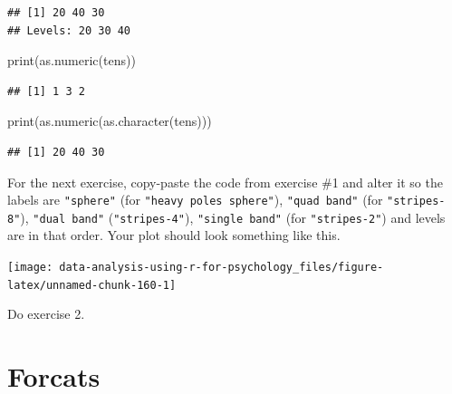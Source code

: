 \documentclass[
]{book}
\newenvironment{Shaded}{\begin{snugshade}}{\end{snugshade}}
\newcommand{\FunctionTok}[1]{\textcolor[rgb]{0.00,0.00,0.00}{#1}}
\newcommand{\NormalTok}[1]{#1}
\begin{document}
\begin{verbatim}
## [1] 20 40 30
## Levels: 20 30 40
\end{verbatim}

\begin{Shaded}
\begin{Highlighting}[]
\FunctionTok{print}\NormalTok{(}\FunctionTok{as.numeric}\NormalTok{(tens))}
\end{Highlighting}
\end{Shaded}

\begin{verbatim}
## [1] 1 3 2
\end{verbatim}

\begin{Shaded}
\begin{Highlighting}[]
\FunctionTok{print}\NormalTok{(}\FunctionTok{as.numeric}\NormalTok{(}\FunctionTok{as.character}\NormalTok{(tens)))}
\end{Highlighting}
\end{Shaded}

\begin{verbatim}
## [1] 20 40 30
\end{verbatim}

For the next exercise, copy-paste the code from exercise \#1 and alter it so the labels are \texttt{"sphere"} (for \texttt{"heavy\ poles\ sphere"}), \texttt{"quad\ band"} (for \texttt{"stripes-8"}), \texttt{"dual\ band"} (\texttt{"stripes-4"}), \texttt{"single\ band"} (for \texttt{"stripes-2"}) and levels are in that order. Your plot should look something like this.

\begin{center}\texttt{[image: data-analysis-using-r-for-psychology\_files/figure-latex/unnamed-chunk-160-1]} \end{center}

Do exercise 2.

\hypertarget{forcats}{%
\section{Forcats}\label{forcats}}
\end{document}
